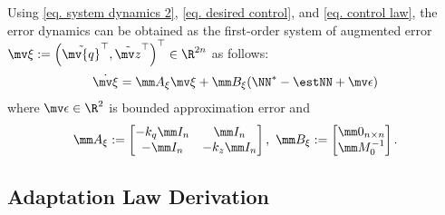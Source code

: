 \documentclass[letterpaper, 10 pt, conference]{ieeeconf}  %
\newcommand*{\q}{\mv{q}}
\begin{document}
Using \eqref{eq. system dynamics 2}, \eqref{eq. desired control}, and \eqref{eq. control law}, the error dynamics can be obtained as the first-order system of augmented error $\mv \xi:=\left(\tilde {\q}^\top ,\tilde {\mv z}^\top\right)^\top \in\R^{2n}$ as follows:
\begin{equation}
    \dot{\mv \xi} 
    = 
    \mm A_\xi{\mv \xi}+\mm B_\xi(\NN^*-\estNN+\mv\epsilon)
\end{equation}
where $\mv \epsilon\in\R^2$ is bounded approximation error and 
\begin{equation}
    \mm A_\xi := 
    \begin{bmatrix}
        -{k_q} \mm I_{n} &\mm I_{n}
        \\
        -\mm I_{n}& -{k_z} \mm I_{n}
    \end{bmatrix}
    ,\ 
    \mm B_\xi := 
    \begin{bmatrix}
        \mm 0_{n\times n}\\\mm M_0^{-1}
    \end{bmatrix}.
\end{equation}

\subsection{Adaptation Law Derivation}\label{sec:adap_laws}
\end{document}
